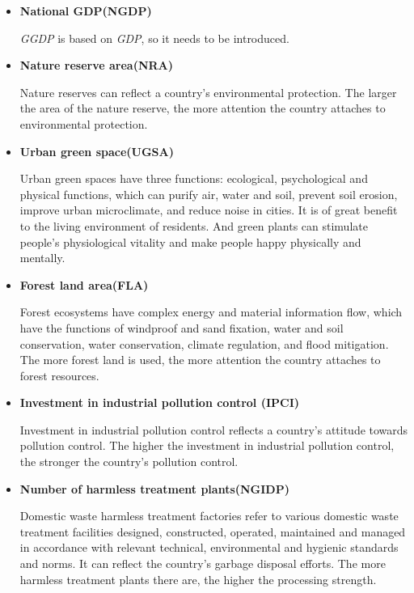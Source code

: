 \documentclass[12pt]{article}
\begin{document}
	
	\begin{itemize}
		\item \textbf{National GDP(NGDP)}
		
		\textit{GGDP} is based on \textit{GDP}, so it needs to be introduced.
		
		\item \textbf{Nature reserve area(NRA) }
		
		Nature reserves can reflect a country's environmental protection.
		The larger the area of the nature reserve, the more attention the country attaches to environmental protection.
		
		\item \textbf{Urban green space(UGSA)}
		
		Urban green spaces have three functions: ecological, psychological and physical functions, which can purify air, water and soil, prevent soil erosion, improve urban microclimate, and reduce noise in cities.
		It is of great benefit to the living environment of residents.
		And green plants can stimulate people's physiological vitality and make people happy physically and mentally.
		
		\item \textbf{Forest land area(FLA)}
		
		Forest ecosystems have complex energy and material information flow, which have the functions of windproof and sand fixation, water and soil conservation, water conservation, climate regulation, and flood mitigation.
		The more forest land is used, the more attention the country attaches to forest resources.
		
		\item \textbf{Investment in industrial pollution control (IPCI)}
		
		Investment in industrial pollution control reflects a country's attitude towards pollution control.
		The higher the investment in industrial pollution control, the stronger the country's pollution control.
		
		\item \textbf{Number of harmless treatment plants(NGIDP) }
		
		Domestic waste harmless treatment factories refer to various domestic waste treatment facilities designed, constructed, operated, maintained and managed in accordance with relevant technical, environmental and hygienic standards and norms.
		It can reflect the country's garbage disposal efforts.
		The more harmless treatment plants there are, the higher the processing strength.
		

\end{itemize}
\end{document}
